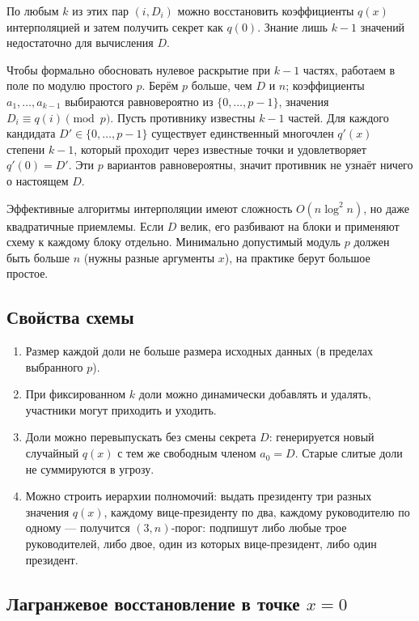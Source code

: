 \documentclass[a4paper,12pt]{article}
\begin{document}
По любым $k$ из этих пар $(i, D_i)$ можно восстановить коэффициенты $q(x)$ интерполяцией и затем получить секрет как $q(0)$. Знание лишь $k-1$ значений недостаточно для вычисления $D$.

Чтобы формально обосновать нулевое раскрытие при $k-1$ частях, работаем в поле по модулю простого $p$. Берём $p$ больше, чем $D$ и $n$; коэффициенты $a_1,\dots,a_{k-1}$ выбираются равновероятно из $\{0,\dots,p-1\}$, значения $D_i \equiv q(i)\pmod p$. Пусть противнику известны $k-1$ частей. Для каждого кандидата $D' \in \{0,\dots,p-1\}$ существует единственный многочлен $q'(x)$ степени $k-1$, который проходит через известные точки и удовлетворяет $q'(0)=D'$. Эти $p$ вариантов равновероятны, значит противник не узнаёт ничего о настоящем $D$.

Эффективные алгоритмы интерполяции имеют сложность $O(n \log^2 n)$, но даже квадратичные приемлемы. Если $D$ велик, его разбивают на блоки и применяют схему к каждому блоку отдельно. Минимально допустимый модуль $p$ должен быть больше $n$ (нужны разные аргументы $x$), на практике берут большое простое.

\subsection*{Свойства схемы}

\begin{enumerate}[label=\arabic*)]
\item Размер каждой доли не больше размера исходных данных (в пределах выбранного $p$).

\item При фиксированном $k$ доли можно динамически добавлять и удалять, участники могут приходить и уходить.

\item Доли можно перевыпускать без смены секрета $D$: генерируется новый случайный $q(x)$ с тем же свободным членом $a_0 = D$. Старые слитые доли не суммируются в угрозу.

\item Можно строить иерархии полномочий: выдать президенту три разных значения $q(x)$, каждому вице‑президенту по два, каждому руководителю по одному — получится $(3,n)$‑порог: подпишут либо любые трое руководителей, либо двое, один из которых вице‑президент, либо один президент.
\end{enumerate}

\subsection*{Лагранжевое восстановление в точке $x=0$}
\end{document}
